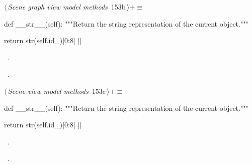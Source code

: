 \documentclass[%
    a4paper,    %
    justified,  %
    nobib,      %
    openany     %
]{tufte-book}
\begin{document}
\begin{flushleft} \small
\begin{minipage}{\linewidth}\label{scrap171}\raggedright\small
{} $\langle\,${\itshape Scene graph view model methods}\nobreak\ {\footnotesize {153b}}$\,\rangle+\equiv$
\vspace{-1ex}
\begin{pythoncode}
def __str__(self):
    """Return the string representation of the current object."""

    return str(self.id_)[0:8]
|\NWsep|
\end{pythoncode}
\vspace{1.5ex}
\footnotesize
\begin{list}{}{\setlength{\itemsep}{-\parsep}\setlength{\itemindent}{-\leftmargin}}
\item \NWtxtMacroDefBy\ .
\item \NWtxtMacroRefIn\ .

\item{}
\end{list}
\end{minipage}\vspace{4ex}
\end{flushleft}
\begin{flushleft} \small
\begin{minipage}{\linewidth}\label{scrap172}\raggedright\small
{} $\langle\,${\itshape Scene view model methods}\nobreak\ {\footnotesize {153c}}$\,\rangle+\equiv$
\vspace{-1ex}
\begin{pythoncode}
def __str__(self):
    """Return the string representation of the current object."""

    return str(self.id_)[0:8]
|\NWsep|
\end{pythoncode}
\vspace{1.5ex}
\footnotesize
\begin{list}{}{\setlength{\itemsep}{-\parsep}\setlength{\itemindent}{-\leftmargin}}
\item \NWtxtMacroDefBy\ .
\item \NWtxtMacroRefIn\ .

\item{}
\end{list}
\end{minipage}\vspace{4ex}
\end{flushleft}
\end{document}
